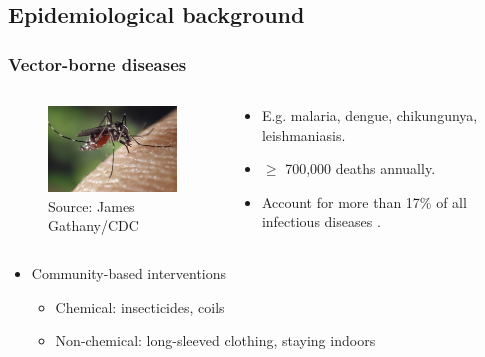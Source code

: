 \documentclass[8pt]{beamer}
\begin{document}

\subsection{Epidemiological background}

\begin{frame}
\frametitle{Vector-borne diseases}

\begin{columns}[t!]
    \begin{column}{5cm}
        \begin{figure}
            \centering
            \includegraphics[width=5cm]{img/mosquito}
            \caption*{\footnotesize Source: James Gathany/CDC\footnotemark[1]}
        \end{figure}
    \end{column}

    \begin{column}{5cm}
    \begin{itemize}
        \item E.g. malaria, dengue, chikungunya, leishmaniasis.
        \item $\mathbf{\ge}$ 700,000 deaths annually.
        \item Account for more than 17\% of all infectious diseases \cite{world_health_organisation_who_vector-borne_2020}.
    \end{itemize}
    \end{column}
\end{columns}

\vspace{.25cm}
\begin{itemize}
    \item Community-based interventions
    \begin{itemize}
        \item Chemical: insecticides, coils
        \item Non-chemical: long-sleeved clothing, staying indoors
    \end{itemize}
\end{itemize}


\end{frame}
\end{document}
